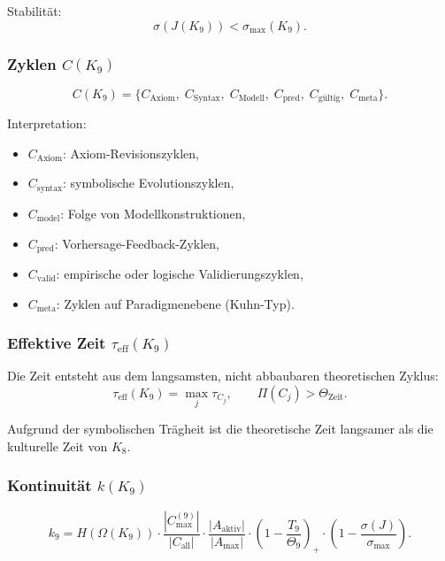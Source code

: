 Stabilität:
\[
\sigma(J(K_9)) < \sigma_{\max}(K_9).
\]

\subsubsection{Zyklen \texorpdfstring{$C(K_9)$}{C(K_9)}}

\[
C(K_9)=
\{
C_{\mathrm{Axiom}},\;
C_{\mathrm{Syntax}},\;
C_{\mathrm{Modell}},\;
C_{\mathrm{pred}},\;
C_{\mathrm{gültig}},\;
C_{\mathrm{meta}}
\}.
\]

Interpretation:
\begin{itemize}
    \item $C_{\mathrm{Axiom}}$: Axiom-Revisionszyklen,
    \item $C_{\mathrm{syntax}}$: symbolische Evolutionszyklen,
    \item $C_{\mathrm{model}}$: Folge von Modellkonstruktionen,
    \item $C_{\mathrm{pred}}$: Vorhersage-Feedback-Zyklen,
    \item $C_{\mathrm{valid}}$: empirische oder logische Validierungszyklen,
    \item $C_{\mathrm{meta}}$: Zyklen auf Paradigmenebene (Kuhn-Typ).
\end{itemize}

\subsubsection{Effektive Zeit \texorpdfstring{$\tau_{\mathrm{eff}}(K_9)$}{tau_eff(K9)}}

Die Zeit entsteht aus dem langsamsten, nicht abbaubaren theoretischen Zyklus:
\[
\tau_{\mathrm{eff}}(K_9)=\max_j \tau_{C_j},
\qquad
\Pi(C_j) > \Theta_{\mathrm{Zeit}}.
\]

Aufgrund der symbolischen Trägheit ist die theoretische Zeit langsamer als die kulturelle Zeit von $K_8$.

\subsubsection{Kontinuität \texorpdfstring{$k(K_9)$}{k(K_9)}}

\[
k_9 =
H(\Omega(K_9))
\cdot
\frac{|C_{\max}^{(9)}|}{|C_{\mathrm{all}}|}
\cdot
\frac{|A_{\mathrm{aktiv}}|}{|A_{\max}|}
\cdot
\left(1-\frac{T_9}{\Theta_9}\right)_+
\cdot
\left(1-\frac{\sigma(J)}{\sigma_{\max}}\right).
\]

